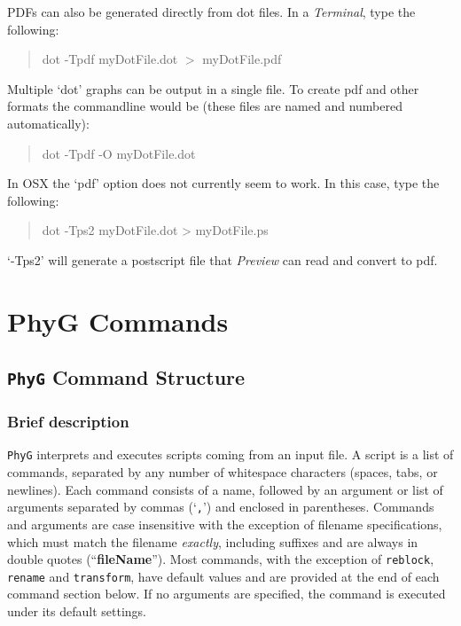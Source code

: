 \documentclass[11pt]{book}
\newcommand{\phyg}{\texttt{PhyG} }
\begin{document}
{{	\noindent PDFs can also be generated directly from dot files. In a \textit{Terminal}, 
	type the following: 

	\begin{quote}
	dot -Tpdf myDotFile.dot $>$ myDotFile.pdf
	\end{quote}
		
	\noindent Multiple `dot' graphs can be output in a single file. To create pdf and 
	other formats the commandline would be (these files are named and numbered 
	automatically):
	
	\begin{quote}
	dot -Tpdf -O myDotFile.dot
	\end{quote}
		
	\noindent In OSX the `pdf' option does not currently seem to work. In this case, 
	type the following:

	\begin{quote}
	dot -Tps2 myDotFile.dot > myDotFile.ps
	\end{quote}
	
	\noindent `-Tps2' will generate a postscript file that \textit{Preview} can read and 
	convert to pdf.

	
\chapter{PhyG Commands}

\section{\phyg Command Structure}
		 
	\subsection{Brief description}
		\phyg interprets and executes scripts coming from an input file. A script is a list of 
		commands, separated by any number of whitespace characters (spaces, tabs, or 
		newlines). Each command consists of a name, followed by an argument or list of 
		arguments separated by commas (`\texttt{,}') and enclosed in parentheses. 
		Commands and arguments are case insensitive with the exception of filename 
		specifications, which must match the filename \textit{exactly}, including suffixes 
		and are always in double quotes (``\textbf{fileName}''). Most commands, with the 
		exception of \texttt{reblock}, \texttt{rename} and \texttt{transform}, have default values 
		and are provided at the end of each command section below. If no arguments are 
		specified, the command is executed under its default settings.\\
		
}}
\end{document}
